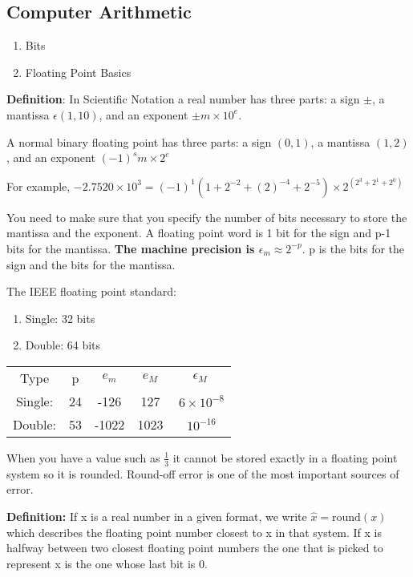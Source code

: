 \documentclass{article}
\newcommand{\n}{\newline}
\begin{document}
	\subsection{Computer Arithmetic}
	\begin{flushleft}
	\begin{enumerate}
		\item Bits 
		\item Floating Point Basics \n
	\end{enumerate} 
	
	\textbf{Definition}: In Scientific Notation a real number has three parts: a sign $\pm$, a mantissa $\epsilon(1,10)$, and an exponent $\pm m\times10^{e}$. \n
	
	A normal binary floating point has three parts: a sign $(0,1)$, a mantissa $(1,2)$, and an exponent $(-1)^{s}m\times2^{e}$ \n
	
	For example, $-2.7520\times10^{3}=(-1)^{1}(1+2^{-2}+(2)^{-4}+2^{-5})\times2^{(2^{3}+2^{1}+2^{0})}$  \n
	
	You need to make sure that you specify the number of bits necessary to store the mantissa and the exponent.  A floating point word is 1 bit for the sign and p-1 bits for the mantissa.  \textbf{The machine precision is $\epsilon_{m}\approx2^{-p}$}.  p is the bits for the sign and the bits for the mantissa. \n
	
	The IEEE floating point standard: \n
	
	\begin{enumerate}
		\item Single: 32 bits
		\item Double: 64 bits\n
	\end{enumerate}
	
	\begin{tabular}{c |c | c | c | c}
		Type & p & $e_{m}$ & $e_{M}$ & $\epsilon_{M}$ \\
		Single: &24 & -126 & 127 & $~6\times10^{-8}$ \\
		Double: & 53 & -1022 & 1023 & $~10^{-16}$ \\
	\end{tabular}
	
	When you have a value such as $\frac{1}{3}$ it cannot be stored exactly in a floating point system so it is rounded.  Round-off error is one of the most important sources of error. \n
	
	\textbf{Definition: }If x is a real number in a given format, we write $\hat{x}=\text{round}(x)$ which describes the floating point number closest to x in that system.  If x is halfway between two closest floating point numbers the one that is picked to represent x is the one whose last bit is 0.  \n
	

\end{flushleft}
\end{document}
